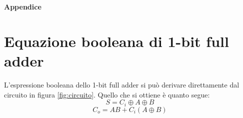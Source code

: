 \newcommand*\xor{\oplus}
\appendix
  \textbf{\huge{Appendice}}
  \section{Equazione booleana di 1-bit full adder}\label{sec:1bfa-equazione}
  L'espressione booleana dello 1-bit full adder si può derivare direttamente dal circuito
  in figura \ref{fig:circuito}.
  Quello che si ottiene è quanto segue:
  \begin{equation}
    S = C_i \xor A \xor B
    \label{eq:S}
  \end{equation}
\begin{equation}
  C_o = AB + C_i(A \xor B)
  \label{eq:Co}
\end{equation}


